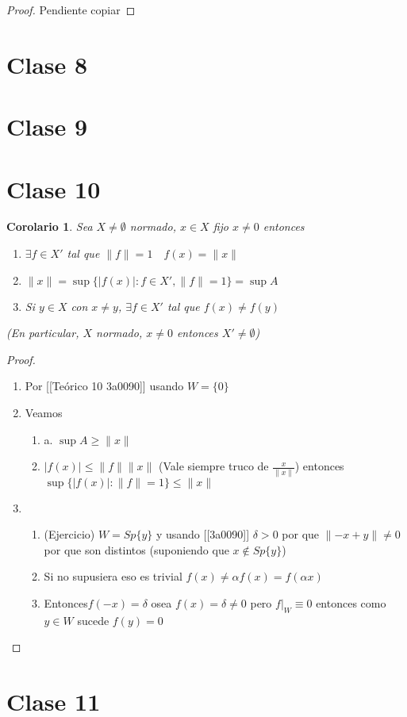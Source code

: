 \documentclass[10pt]{extarticle}
\theoremstyle{break}
\newtheorem{corollary}{Corolario}[theorem]
\theoremstyle{definition}
\begin{document}
\begin{proof}
	Pendiente copiar

\end{proof}


\section{Clase 8}
\section{Clase 9}
\section{Clase 10}

\begin{corollary}\label{10.0}
	Sea $X\neq \emptyset$ normado, $x\in X$ fijo $x\neq 0$ entonces 
	\begin{enumerate}[(a.)]
		\item $\exists f\in X'$ tal que $\lVert f \rVert =1 \quad f(x)=\lVert x \rVert$
		\item $\lVert x \rVert=\sup \{ \lvert f(x) \rvert : f\in X',\lVert f \rVert=1\} =\sup A$
		\item Si $y\in X$ con $x\neq y$, $\exists f\in X'$ tal que $f(x)\neq f(y)$
	\end{enumerate}	(En particular, $X$ normado, $x\neq 0$ entonces $X'\neq \emptyset$)
\end{corollary}

\begin{proof}
	\begin{enumerate}[(a.)]
		\item Por [[Teórico 10 3a0090]] usando $W=\{ 0 \}$
		\item Veamos
			\begin{enumerate}
				\item a. $\sup A \geq \lVert x \rVert$
				\item $\lvert f(x) \rvert\leq \lVert f \rVert\lVert x \rVert$ (Vale siempre truco de $\frac{x}{\lVert x \rVert}$) entonces $\sup \{\lvert f(x) \rvert:\lVert f \rVert=1\}\leq \lVert x \rVert$
			\end{enumerate} 
		\item  \begin{enumerate}
				\item (Ejercicio) $W=Sp\{ y \}$ y usando [[3a0090]] $\delta >0$ por que $\lVert -x+y \rVert\neq 0$ por que son distintos (suponiendo que $x \not\in Sp\{ y \}$)
				\item Si no supusiera eso es trivial $f(x)\neq \alpha f(x) = f(\alpha x)$
				\item Entonces$f(-x)=\delta$ osea $f(x)=\delta\neq 0$ pero $f|_{W}\equiv 0$ entonces como $y\in W$ sucede $f(y)=0$\end{enumerate}
	\end{enumerate}

\end{proof}\section{Clase 11}
\end{document}

